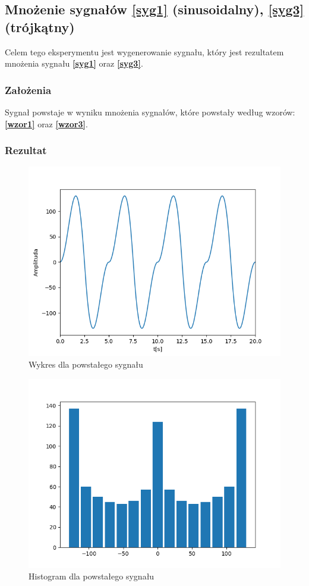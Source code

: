 \documentclass[12pt]{article}
\begin{document}
\subsection{Mnożenie sygnałów \ref{syg1} (sinusoidalny), \ref{syg3} (trójkątny)}
\label{syg7}
Celem tego eksperymentu jest wygenerowanie sygnału, który jest rezultatem mnożenia sygnału  \textbf{\ref{syg1}} oraz  \textbf{\ref{syg3}}.
\subsubsection{Założenia}
Sygnał powstaje w wyniku mnożenia sygnałów, które powstały według wzorów:  \textbf{\ref{wzor1}} oraz  \textbf{\ref{wzor3}}.
\subsubsection{Rezultat}
\begin{figure}[H]
\centering
\includegraphics[scale=0.8]{mnozenieSinusTrojkatWykres.png}
\caption{Wykres dla powstałego sygnału}
\end{figure}
\begin{figure}[H]
\centering
\includegraphics[scale=0.8]{mnozenieSinusTrojkatHist.png}
\caption{Histogram dla powstałego sygnału}
\end{figure}
\end{document}
